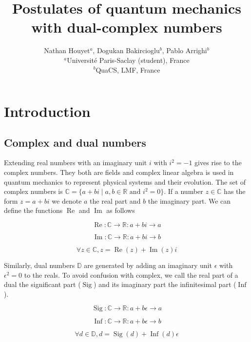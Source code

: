 \documentclass{article}
\title{Postulates of quantum mechanics with dual-complex numbers}
\author{Nathan Houyet$^{a}$, Dogukan Bakircioglu$^{b}$, Pablo Arrighi$^{b}$ \\
        \small $^{a}$Université Paris-Saclay (student), France \\
        \small $^{b}$QuaCS, LMF, France \\
}
\date{}
\newcommand{\R}{\mathbb{R}}
\newcommand{\C}{\mathbb{C}}
\newcommand{\D}{\mathbb{D}}
\newcommand{\e}{\epsilon}
\renewcommand{\Re}{\operatorname{Re}}
\renewcommand{\Im}{\operatorname{Im}}
\newcommand{\Sig}{\operatorname{Sig}}
\newcommand{\Inf}{\operatorname{Inf}}
\begin{document}
\maketitle

\section{Introduction}
\subsection{Complex and dual numbers}
\noindent Extending real numbers with an imaginary unit $i$ with $i^2 = -1$ gives rise to the complex numbers. They both are fields and complex linear algebra is used in quantum mechanics to represent physical systems and their evolution. The set of complex numbers is $\C = \{a + bi \; | \; a, b \in \R \text{ and } i^2 = 0\}$. If a number $z \in \C$ has the form $z = a + bi$ we denote $a$ the real part and $b$ the imaginary part. We can define the functions $\Re$ and $\Im$ as follows
\begin{multicols}{3}
\noindent
\begin{equation}
\Re: \C \to \R: a + bi \to a
\end{equation}

\columnbreak
\noindent
\begin{equation}
\Im: \C \to \R: a + bi \to b
\end{equation}

\columnbreak
\noindent
\begin{equation}
\forall z \in \C, z = \Re(z) + \Im(z)i
\end{equation}

\end{multicols}

Similarly, dual numbers $\D$ are generated by adding an imaginary unit $\e$ with $\e^2 = 0$ to the reals. To avoid confusion with complex, we call the real part of a dual the significant part ($\Sig$) and its imaginary part the infinitesimal part ($\Inf$).

\begin{multicols}{3}
\noindent
\begin{equation}
\Sig: \C \to \R: a + b\e \to a
\end{equation}

\columnbreak
\noindent
\begin{equation}
\Inf: \C \to \R: a + b\e \to b
\end{equation}

\columnbreak
\noindent
\begin{equation}
\forall d \in \D, d = \Sig(d) + \Inf(d)\e
\end{equation}

\end{multicols}
\end{document}
